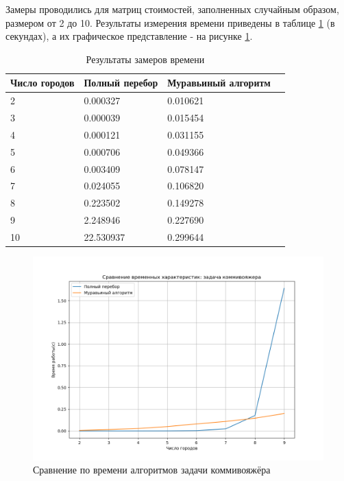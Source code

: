 Замеры проводились для матриц стоимостей, заполненных случайным образом, размером от 2 до 10. Результаты измерения времени приведены в таблице \ref{tab:time} (в секундах), а их графическое представление - на рисунке \ref{img:time}.

\begin{table}[hbtp]
	\begin{center}
		\begin{flushleft}
			\captionsetup{margin*=60pt}
			\caption{\label{tab:time}Результаты замеров времени}
		\end{flushleft}
		\begin{tabular}{|l | l | l | l |} 
 	 	 \hline Число городов & Полный перебор & Муравьиный алгоритм \\ \hline
		2 &   0.000327 &   0.010621 \\ \hline
		3 &   0.000039 &   0.015454 \\ \hline
		4 &   0.000121 &   0.031155 \\ \hline
		5 &   0.000706 &   0.049366 \\ \hline
		6 &   0.003409 &   0.078147 \\ \hline
		7 &   0.024055 &   0.106820 \\ \hline
		8 &   0.223502 &   0.149278 \\ \hline
		9 &   2.248946 &   0.227690 \\ \hline
		10 &  22.530937 &   0.299644 \\ \hline
		\end{tabular}
	\end{center}
\end{table}


\begin{figure}[!h]
	\begin{center}
		\includegraphics[scale=0.7]{images/time.png}
	\end{center}
	\captionsetup{justification=centering}
	\caption{Сравнение по времени алгоритмов задачи коммивояжёра}
	\label{img:time}
\end{figure}

